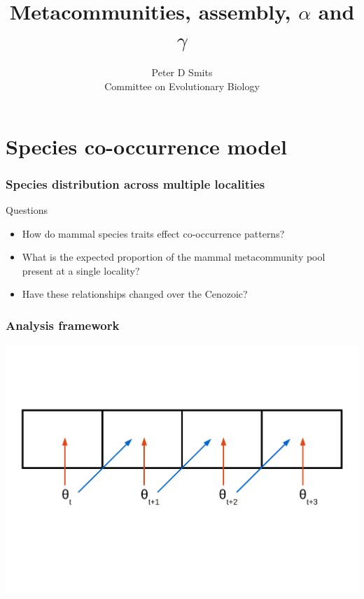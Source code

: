 \documentclass{beamer}
\title{Metacommunities, assembly, \(\alpha\) and \(\gamma\)}
\author{Peter D Smits\\Committee on Evolutionary Biology}
\begin{document}
\begin{frame}
  \maketitle
\end{frame}


\section{Species co-occurrence model}
\begin{frame}
  \frametitle{Species distribution across multiple localities}

  \begin{block}{Questions}
    \begin{itemize}
      \item How do mammal species traits effect co-occurrence patterns?
      \item What is the expected proportion of the mammal metacommunity pool present at a single locality?
      \item Have these relationships changed over the Cenozoic?
    \end{itemize}
  \end{block}
\end{frame}

\begin{frame}
  \frametitle{Analysis framework}
  \begin{center}
    \includegraphics[height = 0.8\textheight, width = \textwidth,  keepaspectratio = true]{figure/predict_perform}
  \end{center}
\end{frame}
\end{document}
